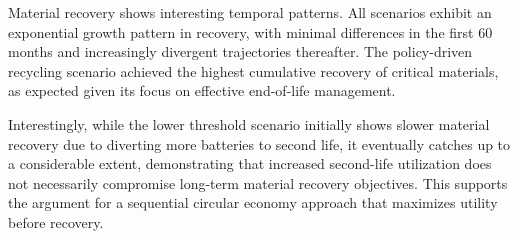 Material recovery shows interesting temporal patterns. All scenarios exhibit an exponential growth pattern in recovery, with minimal differences in the first 60 months and increasingly divergent trajectories thereafter. The policy-driven recycling scenario achieved the highest cumulative recovery of critical materials, as expected given its focus on effective end-of-life management.

Interestingly, while the lower threshold scenario initially shows slower material recovery due to diverting more batteries to second life, it eventually catches up to a considerable extent, demonstrating that increased second-life utilization does not necessarily compromise long-term material recovery objectives. This supports the argument for a sequential circular economy approach that maximizes utility before recovery.